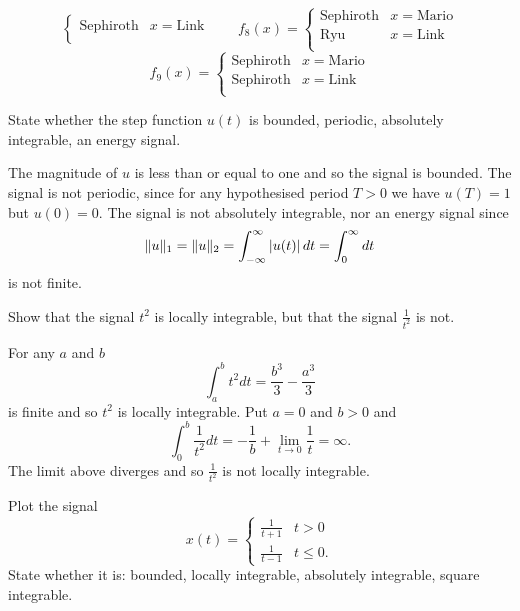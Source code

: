 \begin{excersizelist}
\begin{solution}
\[\begin{cases}
\text{Sephiroth} & x = \text{Link} \\
\end{cases}
\qquad 
f_8(x) = \begin{cases}
\text{Sephiroth} & x = \text{Mario} \\
\text{Ryu} & x = \text{Link} \\
\end{cases}
\]
\[
f_9(x) = \begin{cases}
\text{Sephiroth} & x = \text{Mario} \\
\text{Sephiroth} & x = \text{Link} \\
\end{cases}
\]
\end{solution}

\item \label{excer:stepfunction} State whether the step function $u(t)$ is bounded, periodic, %
absolutely integrable, an energy signal.
\begin{solution}
The magnitude of $u$ is less than or equal to one and so the signal is bounded.  The signal is not periodic, since for any hypothesised period $T > 0$ we have $u(T) = 1$ but $u(0) = 0$.  %
The signal is not absolutely integrable, nor an energy signal since
\[
\|u\|_1 = \|u\|_2 = \int_{-\infty}^\infty \left\vert u(t) \right\vert dt = \int_{0}^\infty dt
\]
is not finite.
\end{solution}

\item \label{exer:oneontnotlocallyint} Show that the signal $t^2$ is locally integrable, but that the signal $\frac{1}{t^2}$ is not. 

\begin{solution}
For any $a$ and $b$
\[
\int_a^b t^2 dt = \frac{b^3}{3} - \frac{a^3}{3}
\]
is finite and so $t^2$ is locally integrable.  Put $a = 0$ and $b > 0$ and
\[
\int_0^b \frac{1}{t^2} dt = -\frac{1}{b} + \lim_{t \to 0}\frac{1}{t}  = \infty.
\]
The limit above diverges and so $\frac{1}{t^2}$ is not locally integrable. 
\end{solution}


\item \label{exer:functionsquarenotabsint} Plot the signal 
\[
x(t) = \begin{cases}
\tfrac{1}{t+1} & t > 0 \\
\tfrac{1}{t-1} & t \leq 0.
\end{cases}
\]
State whether it is: bounded, locally integrable, absolutely integrable, square integrable.


\end{excersizelist}
